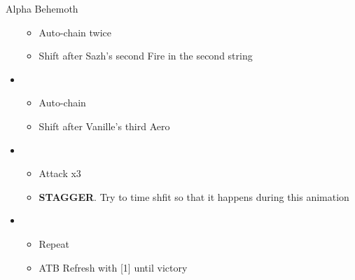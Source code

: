 \begin{paracol}{2}
\begin{battle}{Alpha Behemoth}
\begin{itemize}
    \begin{itemize}
        \item Auto-chain twice
        \item Shift after Sazh's second Fire in the second string
    \end{itemize}
    \item \fourth
    \begin{itemize}
        \item Auto-chain
        \item Shift after Vanille's third Aero
    \end{itemize}
    \item \first
    \begin{itemize}
        \item Attack x3
        \item \textbf{STAGGER}. Try to time shfit so that it happens during this animation
    \end{itemize}
    \item \fifth
    \begin{itemize}
        \item Repeat
        \item ATB Refresh with [1] until victory
    \end{itemize}
\end{itemize}
\end{battle}
\switchcolumn*



	 
	
\switchcolumn



	 
	\switchcolumn*


\end{paracol}
